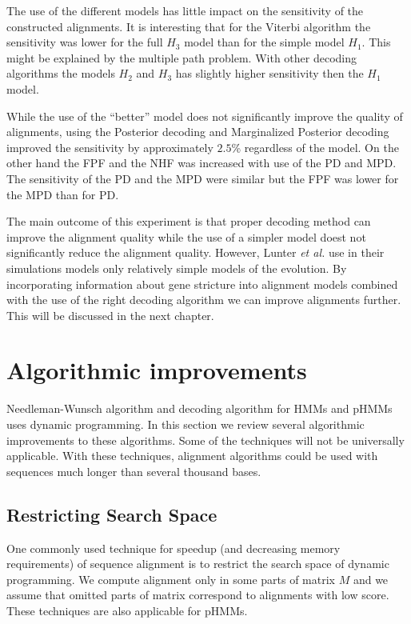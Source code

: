 The use of the different models has little impact on the sensitivity of the
constructed alignments. It is interesting that for the Viterbi algorithm the
sensitivity was lower for the full $H_3$ model than for the simple model $H_1$.
This might be explained by the multiple path problem.  With other decoding
algorithms the models $H_2$ and $H_3$ has slightly higher sensitivity then the
$H_1$ model. 

While the use of the ``better'' model does not significantly improve the quality
of alignments, using the Posterior decoding and Marginalized Posterior decoding
improved the sensitivity by approximately $2.5$\% regardless of the model. On
the other hand the FPF and the NHF was increased with use of the PD and MPD. The
sensitivity of the PD and the MPD were similar but the FPF was lower for the MPD
than for PD. 

The main outcome of this experiment is that proper decoding method can improve
the alignment quality while the use of a simpler model doest not significantly
reduce the alignment quality. However, Lunter {\it et al.} use in their
simulations models only relatively simple models of the evolution. By
incorporating information about gene stricture into alignment models combined
with the use of the right decoding algorithm we can improve alignments further.
This will be discussed in the next chapter. 



\section{Algorithmic improvements}\label{SECTION:ALGORITHMICIMPROVEMENTS}

Needleman-Wunsch algorithm and decoding algorithm for HMMs and pHMMs uses
dynamic programming. In this section we review several algorithmic improvements
to these algorithms. Some of the techniques will not be universally applicable.
With these techniques, alignment algorithms could be used with sequences much
longer than several thousand bases.

\subsection{Restricting Search Space}

One commonly used technique for speedup (and decreasing memory requirements) of
sequence alignment is to restrict the search space of dynamic programming. We
compute alignment only in some parts of matrix $M$ and we assume that omitted
parts of matrix correspond to alignments with low score. These techniques are also 
applicable for pHMMs.

